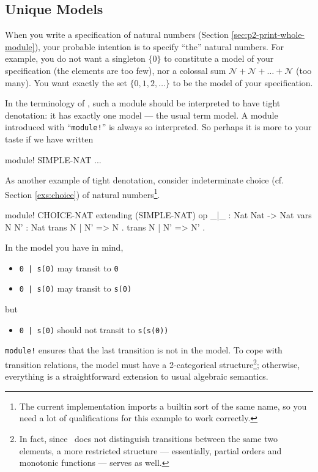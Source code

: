 \documentclass[a4paper]{memoir}
\begin{document}
\subsection{Unique Models}\label{sec:p2-unique-model}

When you write a specification of natural numbers (Section
\ref{sec:p2-print-whole-module}), your probable intention is
to specify ``the'' natural numbers. For example, you do not
want a singleton $\{ 0 \}$ to constitute a model of
your specification (the elements are too few), nor a colossal
sum $\mathcal{N} + \mathcal{N} + \ldots + \mathcal{N}$ (too many).
You want exactly the set $\{ 0, 1, 2, \ldots \}$ to be the
model of your specification.

In the terminology of \cafeobj, such a module should be interpreted to have
tight denotation: it has exactly one model --- the usual term
model. A module introduced with ``\verb|module!|'' is always so interpreted.
So perhaps it is more to your taste if we have written
\begin{vvtm}
\begin{ccode}
  module! SIMPLE-NAT {
  ...
  }
\end{ccode}
\end{vvtm}
As another example of tight denotation, consider indeterminate
choice (cf. Section \ref{exs:choice}) of natural numbers\footnote{
The current implementation imports a
builtin sort of the same name, so you need a lot of qualifications
for this example to work correctly.

}.
\label{exs:choice-nat}
\begin{vvtm}
\begin{ccode}
  module! CHOICE-NAT {
    extending (SIMPLE-NAT)
    op _|_ : Nat Nat -> Nat
    vars N N' : Nat
    trans N | N' => N .
    trans N | N' => N' .
  }
\end{ccode}
\end{vvtm}
In the model you have in mind,
\begin{itemize}
\item[] \verb+0 | s(0)+ may transit to \verb|0|
\item[] \verb+0 | s(0)+ may transit to \verb|s(0)|
\end{itemize}
but
\begin{itemize}
\item[] \verb+0 | s(0)+ should not transit to \verb|s(s(0))|
\end{itemize}
\verb|module!| ensures that the last transition is not in the model.
To cope with transition relations, the model must have a 2-categorical
structure\footnote{
In fact, since \cafeobj~does not distinguish transitions between the
same two elements, a more restricted structure --- essentially,
partial orders and monotonic functions --- serves as well.
}; otherwise, everything is a straightforward extension to usual
algebraic semantics.
\end{document}

